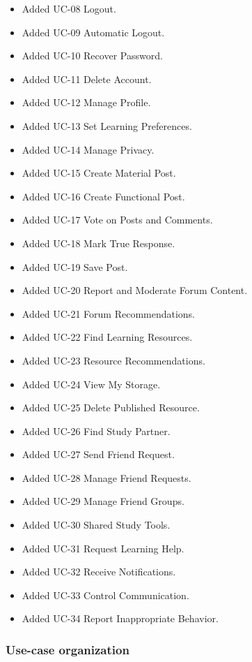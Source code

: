 \documentclass[12pt]{article}
\begin{document}
\begin{itemize}
\item Added UC-08 Logout.
\item Added UC-09 Automatic Logout.
\item Added UC-10 Recover Password.
\item Added UC-11 Delete Account.
\item Added UC-12 Manage Profile.
\item Added UC-13 Set Learning Preferences.
\item Added UC-14 Manage Privacy.
\item Added UC-15 Create Material Post.
\item Added UC-16 Create Functional Post.
\item Added UC-17 Vote on Posts and Comments.
\item Added UC-18 Mark True Response.
\item Added UC-19 Save Post.
\item Added UC-20 Report and Moderate Forum Content.
\item Added UC-21 Forum Recommendations.
\item Added UC-22 Find Learning Resources.
\item Added UC-23 Resource Recommendations.
\item Added UC-24 View My Storage.
\item Added UC-25 Delete Published Resource.
\item Added UC-26 Find Study Partner.
\item Added UC-27 Send Friend Request.
\item Added UC-28 Manage Friend Requests.
\item Added UC-29 Manage Friend Groups.
\item Added UC-30 Shared Study Tools.
\item Added UC-31 Request Learning Help.
\item Added UC-32 Receive Notifications.
\item Added UC-33 Control Communication.
\item Added UC-34 Report Inappropriate Behavior.
\end{itemize}
\par\medskip

\hypertarget{sec:use-case-organization}{}
\subsubsection*{Use-case organization}
\par\medskip
\end{document}
